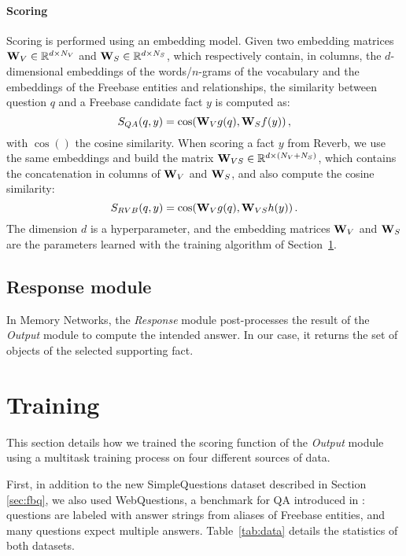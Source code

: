 \documentclass[11pt,a4paper]{article}
\newcommand{\fb}{{\sf Freebase}\xspace}
\newcommand{\wq}{{\sf WebQuestions}\xspace}
\newcommand{\rv}{{\sf Reverb}\xspace}
\newcommand{\fbq}{{\sf SimpleQuestions}\xspace}
\renewcommand{\Re}{\mathbb{R}}
\newcommand{\phifact}{f}
\newcommand{\phiq}{g}
\newcommand{\phirv}{h}
\newcommand{\fact}{y}
\newcommand{\rvfact}{y}
\newcommand{\ques}{q}
\newcommand{\score}{S}
\begin{document}
\paragraph{Scoring}
Scoring is performed using an embedding model. Given two embedding
matrices ${\bf W}_V \in \Re^{d\times N_V}$ and ${\bf W}_S \in
\Re^{d\times N_S}$, which respectively contain, in columns, the
$d$-dimensional embeddings of the words/$n$-grams of the vocabulary
and the embeddings of the \fb entities and relationships, the
similarity between question $\ques$ and a \fb candidate fact $\fact$ is
computed as:
\begin{equation*}
\score_{QA}(\ques, \fact) = \cos({\bf W}_V \phiq(\ques), {\bf
  W}_S\phifact(\fact))\,,
\end{equation*}
with $ \cos()$ the cosine similarity.
When scoring a fact $\rvfact$ from \rv, we use the same embeddings and
build the matrix ${\bf W}_{VS} \in \Re^{d\times (N_V+N_S)}$, which
contains the concatenation in columns of ${\bf W}_V$ and ${\bf W}_S$,
and also compute the cosine similarity:
\begin{equation*}
\score_{RVB}(\ques, \rvfact) = \cos({\bf W}_V \phiq(\ques), {\bf W}_{VS}\phirv(\rvfact))\,.
\end{equation*}
The dimension $d$ is a hyperparameter, and the embedding
matrices ${\bf W}_V$ and ${\bf W}_S$ are the parameters learned
with the training algorithm of Section~\ref{sec:training}.

\subsection{Response module}
In Memory Networks, the {\it Response} module post-processes the
result of the {\it Output} module to compute the intended answer. In
our case, it returns the set of objects of the selected supporting
fact.




\section{Training}
\label{sec:training}

This section details how we trained the scoring function of the {\it
  Output} module using a multitask training process on
four different sources of data. 

First, in addition to the new \fbq dataset described in Section
\ref{sec:fbq}, we also used \wq, a benchmark for QA 
introduced in \cite{berant-EtAl:2013:EMNLP}: questions are labeled with answer
strings from aliases of \fb entities, and many questions expect
multiple answers.
Table~\ref{tab:data} details the statistics of both datasets.
\end{document}
